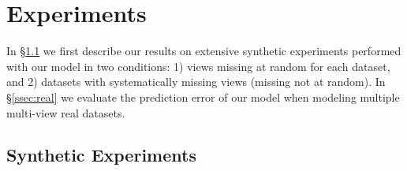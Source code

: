\section{Experiments}

In \S\ref{ssec:synth} we first describe our results on extensive synthetic experiments performed with our model in two conditions:
1) views missing at random for each dataset,
and 2) datasets with systematically missing views (missing not at random).
In \S\ref{ssec:real} we evaluate the prediction error of our model when modeling multiple multi-view real datasets.

\subsection{Synthetic Experiments}
\label{ssec:synth}


